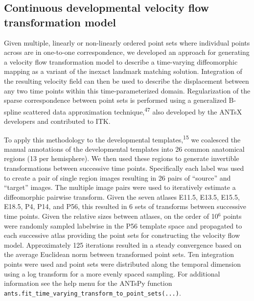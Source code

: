 \documentclass[
  12pt,
]{article}
\begin{document}
\hypertarget{continuous-developmental-velocity-flow-transformation-model}{%
\subsection*{Continuous developmental velocity flow transformation
model}\label{continuous-developmental-velocity-flow-transformation-model}}

Given multiple, linearly or non-linearly ordered point sets where
individual points across are in one-to-one correspondence, we developed
an approach for generating a velocity flow transformation model to
describe a time-varying diffeomorphic mapping as a variant of the
inexact landmark matching solution. Integration of the resulting
velocity field can then be used to describe the displacement between any
two time points within this time-parameterized domain. Regularization of
the sparse correspondence between point sets is performed using a
generalized B-spline scattered data approximation
technique,\textsuperscript{47} also developed by the ANTsX developers
and contributed to ITK.

To apply this methodology to the developmental
templates,\textsuperscript{15} we coalesced the manual annotations of
the developmental templates into 26 common anatomical regions (13 per
hemisphere). We then used these regions to generate invertible
transformations between successive time points. Specifically each label
was used to create a pair of single region images resulting in 26 pairs
of ``source'' and ``target'' images. The multiple image pairs were used
to iteratively estimate a diffeomorphic pairwise transform. Given the
seven atlases E11.5, E13.5, E15.5, E18.5, P4, P14, and P56, this
resulted in 6 sets of transforms between successive time points. Given
the relative sizes between atlases, on the order of 10\(^6\) points were
randomly sampled labelwise in the P56 template space and propagated to
each successive atlas providing the point sets for constructing the
velocity flow model. Approximately 125 iterations resulted in a steady
convergence based on the average Euclidean norm between transformed
point sets. Ten integration points were used and point sets were
distributed along the temporal dimension using a log transform for a
more evenly spaced sampling. For additional information see the help
menu for the ANTsPy function
\texttt{ants.fit\_time\_varying\_transform\_to\_point\_sets(...)}.
\end{document}

